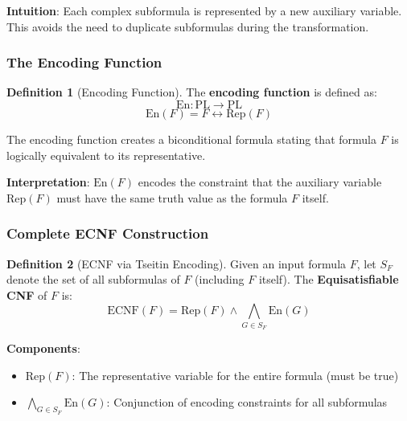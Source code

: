 \documentclass[11pt,a4paper]{article}
\theoremstyle{definition}
\newtheorem{definition}{Definition}[section]
\theoremstyle{plain}
\theoremstyle{remark}
\begin{document}
\textbf{Intuition}: Each complex subformula is represented by a new auxiliary variable. This avoids the need to duplicate subformulas during the transformation.

\subsubsection{The Encoding Function}

\begin{tcolorbox}[colback=cyan!5!white,colframe=cyan!75!black,title=\textbf{Encoding Function}]
\begin{definition}[Encoding Function]
The \textbf{encoding function} is defined as:
\[
\text{En}: \text{PL} \rightarrow \text{PL}
\]
\[
\text{En}(F) = F \leftrightarrow \text{Rep}(F)
\]
\end{definition}
\end{tcolorbox}

The encoding function creates a biconditional formula stating that formula $F$ is logically equivalent to its representative.

\textbf{Interpretation}: $\text{En}(F)$ encodes the constraint that the auxiliary variable $\text{Rep}(F)$ must have the same truth value as the formula $F$ itself.

\subsubsection{Complete ECNF Construction}

\begin{tcolorbox}[colback=orange!10!white,colframe=orange!75!black,title=\textbf{ECNF via Tseitin Encoding}]
\begin{definition}[ECNF via Tseitin Encoding]
Given an input formula $F$, let $S_F$ denote the set of all subformulas of $F$ (including $F$ itself). The \textbf{Equisatisfiable CNF} of $F$ is:
\[
\text{ECNF}(F) = \text{Rep}(F) \land \bigwedge_{G \in S_F} \text{En}(G)
\]
\end{definition}
\end{tcolorbox}

\textbf{Components}:
\begin{itemize}
    \item $\text{Rep}(F)$: The representative variable for the entire formula (must be true)
    \item $\bigwedge_{G \in S_F} \text{En}(G)$: Conjunction of encoding constraints for all subformulas
\end{itemize}
\end{document}
